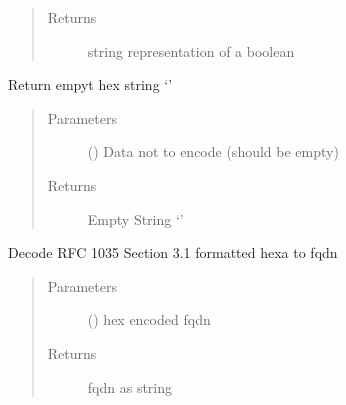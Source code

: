 \documentclass[letterpaper,10pt,english]{sphinxmanual}
\begin{document}
\begin{fulllineitems}
\begin{fulllineitems}
\begin{quote}
\begin{description}
\item[{Returns}] \leavevmode
\sphinxAtStartPar
string representation of a boolean

\end{description}\end{quote}

\end{fulllineitems}


\begin{fulllineitems}
\label{\detokenize{dhcp_decode-class:bloxone.dhcp_decode.hex_to_empty}}
\sphinxAtStartPar
Return empyt hex string ‘’
\begin{quote}\begin{description}
\item[{Parameters}] \leavevmode
\sphinxAtStartPar
{} () \textendash{} Data not to encode (should be empty)

\item[{Returns}] \leavevmode
\sphinxAtStartPar
Empty String ‘’

\end{description}\end{quote}

\end{fulllineitems}


\begin{fulllineitems}
\label{\detokenize{dhcp_decode-class:bloxone.dhcp_decode.hex_to_fqdn}}
\sphinxAtStartPar
Decode RFC 1035 Section 3.1 formatted hexa to fqdn
\begin{quote}\begin{description}
\item[{Parameters}] \leavevmode
\sphinxAtStartPar
{} () \textendash{} hex encoded fqdn

\item[{Returns}] \leavevmode
\sphinxAtStartPar
fqdn as string


\end{description}
\end{quote}
\end{fulllineitems}
\end{fulllineitems}
\end{document}
